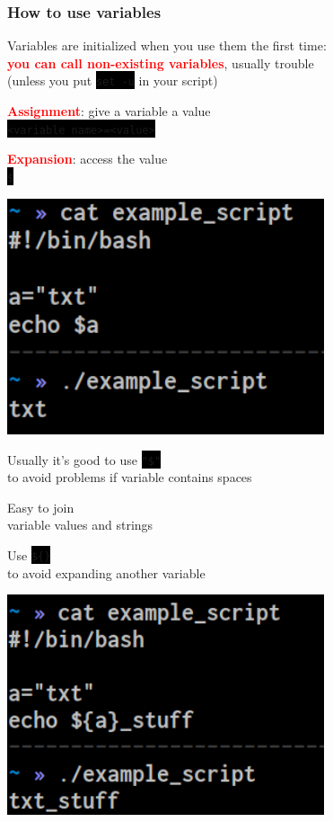 \documentclass[unknownkeysallowed, 10pt, a4 paper, handout]{beamer}
\newcommand{\focus}[1]{\textbf{\textcolor{red}{#1}}}
\newcommand{\code}[1]{\colorbox{black}{\color{green}\texttt{#1}}}
\newcommand{\sidebyside}[5]{
  \begin{minipage}{#1\textwidth}
    #2
  \end{minipage} #3 \begin{minipage}{#4\textwidth}
    #5
  \end{minipage}
}
\begin{document}
\begin{frame}
  \begin{center}
    \frametitle{How to use variables}

    Variables are initialized when you use them the first time:\\
    \focus{you can call non-existing variables}, usually trouble\\
    (unless you put \code{set -u} in your script)

    \sidebyside{0.50}{
      \centering
      \focus{Assignment}: give a variable a value\\
      \code{<variable name>=<value>}

      \vspace{3mm}

      \focus{Expansion}: access the value\\
      \code{\$<variable name>}
    }{\hfill}{0.45}{
      \begin{center}
        \includegraphics[width=0.70\textwidth]{pics/variables_1.png}
      \end{center}
    }

    Usually it's good to use \code{"\$<variable name>"}\\
    to avoid problems if variable contains spaces

    \sidebyside{0.50}{
      \centering
      Easy to join\\
      variable values and strings

      \vspace{2mm}

      Use \code{\$\{<variable name>\}}\\
      to avoid expanding another variable
    }{\hfill}{0.45}{
      \begin{center}
        \includegraphics[width=0.70\textwidth]{pics/variables_2.png}
      \end{center}
    }
  \end{center}
\end{frame}
\end{document}

